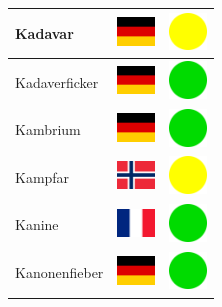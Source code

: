 \documentclass[12pt, a4paper, twoside]{report}
\begin{document}
\begin{center}
\begin{longtable}{|p{5cm}|p{2cm}|p{2cm}|}
 Kadavar                                                    & \includegraphics[width=1cm]{4x3/de} &   \includegraphics[width=1cm]{likes/m} \\ \hline
 Kadaverficker                                              & \includegraphics[width=1cm]{4x3/de} &   \includegraphics[width=1cm]{likes/y} \\ \hline
 Kambrium                                                   & \includegraphics[width=1cm]{4x3/de} &   \includegraphics[width=1cm]{likes/y} \\ \hline
 Kampfar                                                    & \includegraphics[width=1cm]{4x3/no} &   \includegraphics[width=1cm]{likes/m} \\ \hline
 Kanine                                                     & \includegraphics[width=1cm]{4x3/fr} &   \includegraphics[width=1cm]{likes/y} \\ \hline
 Kanonenfieber                                              & \includegraphics[width=1cm]{4x3/de} &   \includegraphics[width=1cm]{likes/y} \\ \hline

\end{longtable}
\end{center}
\end{document}
